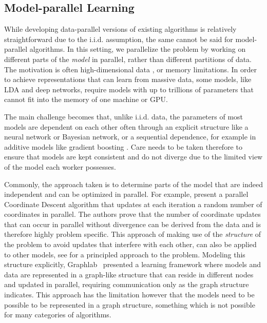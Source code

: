 \subsection*{Model-parallel Learning}

While developing data-parallel versions of existing algorithms is relatively straightforward
due to the i.i.d. assumption, the same cannot be said for model-parallel algorithms. In this
setting, we parallelize the problem by working on different parts of the \emph{model}
in parallel, rather than different partitions of data. The motivation is often
high-dimensional data \cite{parallel-cd-l1}, or
memory limitations. In order to achieve representations
that can learn from massive data, some models, like LDA and deep networks, require
models with up to trillions of parameters \cite{lightLDA, large-scale-dl}
that cannot fit into the memory of one machine or GPU.

The main challenge becomes
that, unlike i.i.d. data, the parameters of most models are dependent on each
other often through an explicit structure like a neural network or Bayesian network, or a
sequential dependence, for example in additive models like gradient boosting \cite{esl}.
Care needs to be taken therefore to ensure that models are kept consistent and do not
diverge due to the limited view of the model each worker possesses.

Commonly, the approach taken is to determine parts of the model that are indeed
independent and can be optimized in parallel. For example, \citet{parallel-cd-l1}
present a parallel Coordinate Descent algorithm that updates at each iteration
a random number of coordinates in parallel. The authors prove that the number of coordinate updates
that can occur in parallel without divergence can be derived from the data and is therefore
highly problem specific. This approach of making use of the \emph{structure} of
the problem to avoid updates that interfere with each other, can also be applied
to other models, see \citet{model-parallel-learning} for a principled approach
to the problem.
Modeling this structure explicitly, Graphlab~\cite{graphlab, graphlab-distributed} presented a learning framework
where models and data are represented in a graph-like structure that can reside in different
nodes and updated in parallel, requiring communication only as the graph structure
indicates. This approach has the limitation however that the models need to be
possible to be represented in a graph structure, something which is not possible
for many categories of algorithms.

